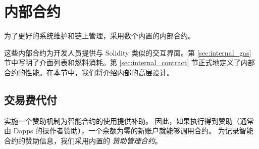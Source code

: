 \section{内部合约}
\label{sec:internal}
为了更好的系统维护和链上管理，\name 采用数个内置的内部合约。
%

这些内部合约为开发人员提供与 Solidity 类似的交互界面。第 \ref{sec:internal_gas} 节中写明了介面列表和燃料消耗。第 \ref{sec:internal_contract} 节正式地定义了内部合约的性能。在本节中，我们将介绍内部的高层设计。


\subsection{交易费代付}
\label{sec:sponsor}

\name 实施一个赞助机制为智能合约的使用提供补助。
因此，如果执行得到赞助（通常由 Dapps 的操作者赞助），一个余额为零的新账户就能够调用合约。
为记录智能合约的赞助信息，我们采用内置的 \emph{赞助管理合约}。 

